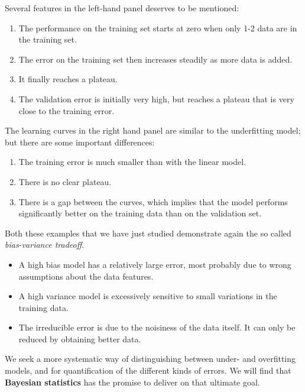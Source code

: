 \documentclass[%
oneside,                 %
final,                   %
10pt]{article}
\begin{document}
Several features in the left-hand panel deserves to be mentioned:

\begin{enumerate}
\item The performance on the training set starts at zero when only 1-2 data are in the training set.

\item The error on the training set then increases steadily as more data is added. 

\item It finally reaches a plateau.

\item The validation error is initially very high, but reaches a plateau that is very close to the training error.
\end{enumerate}

\noindent
The learning curves in the right hand panel are similar to the underfitting model; but there are some important differences:

\begin{enumerate}
\item The training error is much smaller than with the linear model.

\item There is no clear plateau.

\item There is a gap between the curves, which implies that the model performs significantly better on the training data than on the validation set.
\end{enumerate}

\noindent
Both these examples that we have just studied demonstrate again the so called \emph{bias-variance tradeoff}.

\begin{itemize}
 \item A high bias model has a relatively large error, most probably due to wrong assumptions about the data features.

 \item A high variance model is excessively sensitive to small variations in the training data.

 \item The irreducible error is due to the noisiness of the data itself. It can only be reduced by obtaining better data.
\end{itemize}

\noindent
We seek a more systematic way of distinguishing between under- and overfitting models, and for quantification of the different kinds of errors. We will find that \textbf{Bayesian statistics} has the promise to deliver on that ultimate goal.



\end{document}
